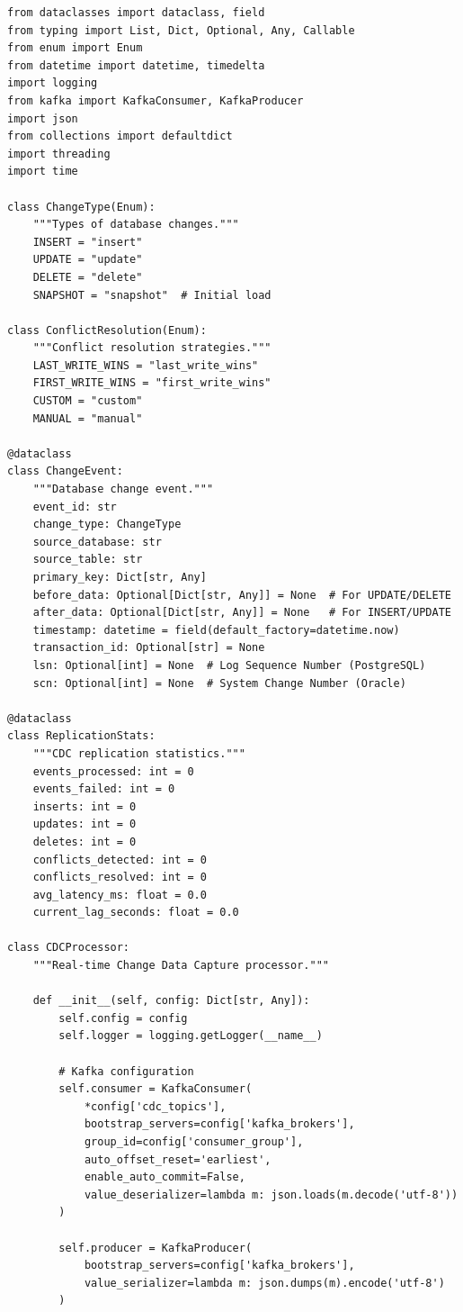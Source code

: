\begin{lstlisting}[style=python, caption=CDCProcessor with Change Stream Handling]
from dataclasses import dataclass, field
from typing import List, Dict, Optional, Any, Callable
from enum import Enum
from datetime import datetime, timedelta
import logging
from kafka import KafkaConsumer, KafkaProducer
import json
from collections import defaultdict
import threading
import time

class ChangeType(Enum):
    """Types of database changes."""
    INSERT = "insert"
    UPDATE = "update"
    DELETE = "delete"
    SNAPSHOT = "snapshot"  # Initial load

class ConflictResolution(Enum):
    """Conflict resolution strategies."""
    LAST_WRITE_WINS = "last_write_wins"
    FIRST_WRITE_WINS = "first_write_wins"
    CUSTOM = "custom"
    MANUAL = "manual"

@dataclass
class ChangeEvent:
    """Database change event."""
    event_id: str
    change_type: ChangeType
    source_database: str
    source_table: str
    primary_key: Dict[str, Any]
    before_data: Optional[Dict[str, Any]] = None  # For UPDATE/DELETE
    after_data: Optional[Dict[str, Any]] = None   # For INSERT/UPDATE
    timestamp: datetime = field(default_factory=datetime.now)
    transaction_id: Optional[str] = None
    lsn: Optional[int] = None  # Log Sequence Number (PostgreSQL)
    scn: Optional[int] = None  # System Change Number (Oracle)

@dataclass
class ReplicationStats:
    """CDC replication statistics."""
    events_processed: int = 0
    events_failed: int = 0
    inserts: int = 0
    updates: int = 0
    deletes: int = 0
    conflicts_detected: int = 0
    conflicts_resolved: int = 0
    avg_latency_ms: float = 0.0
    current_lag_seconds: float = 0.0

class CDCProcessor:
    """Real-time Change Data Capture processor."""

    def __init__(self, config: Dict[str, Any]):
        self.config = config
        self.logger = logging.getLogger(__name__)

        # Kafka configuration
        self.consumer = KafkaConsumer(
            *config['cdc_topics'],
            bootstrap_servers=config['kafka_brokers'],
            group_id=config['consumer_group'],
            auto_offset_reset='earliest',
            enable_auto_commit=False,
            value_deserializer=lambda m: json.loads(m.decode('utf-8'))
        )

        self.producer = KafkaProducer(
            bootstrap_servers=config['kafka_brokers'],
            value_serializer=lambda m: json.dumps(m).encode('utf-8')
        )


\end{lstlisting}
